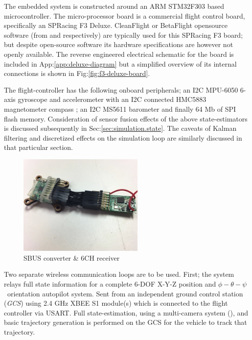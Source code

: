 The embedded system is constructed around an ARM STM32F303\cite{stm32f303} based microcontroller. The micro-processor board is a commercial flight control board, specifically an SPRacing F3 Deluxe\cite{spracing}. CleanFlight or BetaFlight opensource software (from \cite{cleanflight} and \cite{betaflight} respectively) are typically used for this SPRacing F3 board; but despite open-source software its hardware specifications are  however not openly available. The reverse engineered electrical schematic for the board is included in App:\ref{app:deluxe-diagram} but a simplified overview of its internal connections is shown in Fig:\ref{fig:f3-deluxe-board}.
\par
The flight-controller has the following onboard peripherals; an I2C MPU-6050 6-axis gyroscope and accelerometer \cite{mpu6050} with an I2C connected HMC5883 magnetometer compass \cite{hmc5883}; an I2C MS5611 barometer \cite{ms5611} and finally 64 Mb of SPI flash memory. Consideration of sensor fusion effects of the above state-estimators is discussed subsequently in Sec:\ref{sec:simulation.state}. The caveats of Kalman filtering and discretized effects on the simulation loop are similarly discussed in that particular section.
\begin{figure}[hbtp]
\centering
\includegraphics[width=0.55\textwidth]{figs/ppm-sbus}
\caption{SBUS converter \& 6CH receiver}
\label{fig:ppm-sbus}
\vspace{-20pt}
\end{figure}
\par
Two separate wireless communication loops are to be used. First; the system relays full state information for a complete 6-DOF X-Y-Z position and $\phi-\theta-\psi$~orientation autopilot system. Sent from an independent ground control station (\emph{GCS}) using 2.4 GHz XBEE S1 module(s)\cite{xbees1} which is connected to the flight controller via USART. Full state-estimation, using a multi-camera system (\cite{arnold}), and basic trajectory generation is performed on the GCS for the vehicle to track that trajectory. 
